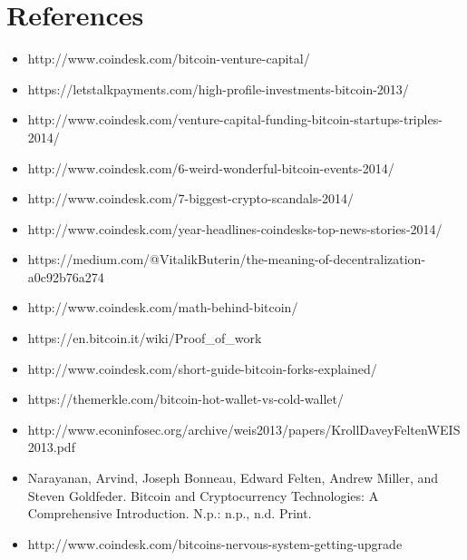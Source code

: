 \documentclass[11pt]{article}
\begin{document}
    
    \setlength{\parindent}{0pt}
    
    \section*{References}
    \begin{itemize}
        \item http://www.coindesk.com/bitcoin-venture-capital/
        \item https://letstalkpayments.com/high-profile-investments-bitcoin-2013/ 
        \item http://www.coindesk.com/venture-capital-funding-bitcoin-startups-triples-2014/ 
        \item http://www.coindesk.com/6-weird-wonderful-bitcoin-events-2014/ 
        \item http://www.coindesk.com/7-biggest-crypto-scandals-2014/ 
        \item http://www.coindesk.com/year-headlines-coindesks-top-news-stories-2014/ 
        \item https://medium.com/@VitalikButerin/the-meaning-of-decentralization-a0c92b76a274 
        \item http://www.coindesk.com/math-behind-bitcoin/
        \item https://en.bitcoin.it/wiki/Proof\_of\_work
        \item http://www.coindesk.com/short-guide-bitcoin-forks-explained/
        \item https://themerkle.com/bitcoin-hot-wallet-vs-cold-wallet/
        \item http://www.econinfosec.org/archive/weis2013/papers/KrollDaveyFeltenWEIS2013.pdf
        \item Narayanan, Arvind, Joseph Bonneau, Edward Felten, Andrew Miller, and Steven Goldfeder. Bitcoin and Cryptocurrency Technologies: A Comprehensive Introduction. N.p.: n.p., n.d. Print.
        \item http://www.coindesk.com/bitcoins-nervous-system-getting-upgrade
    \end{itemize}
    
\end{document}
